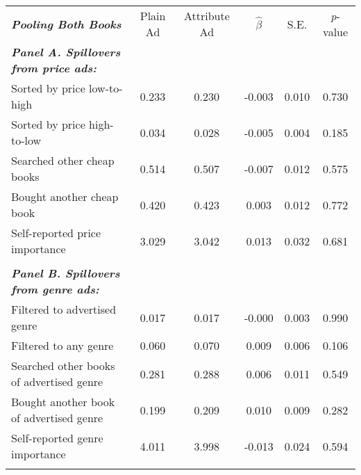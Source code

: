 \begin{center}
\begin{tabular}{lccccc}
\hline \noalign{\smallskip}\textbf{\emph{Pooling Both Books}} & Plain Ad & Attribute Ad & $\hat{\beta}$ & S.E. & \emph{p}-value\\
\noalign{\smallskip}\hline \noalign{\smallskip}\textbf{\emph{Panel A. Spillovers from price ads:}} &  &  &  &  & \\
\hspace{5pt} Sorted by price low-to-high & 0.233 & 0.230 & -0.003 & 0.010 & 0.730\\
\hspace{5pt} Sorted by price high-to-low & 0.034 & 0.028 & -0.005 & 0.004 & 0.185\\
\hspace{5pt} Searched other cheap books & 0.514 & 0.507 & -0.007 & 0.012 & 0.575\\
\hspace{5pt} Bought another cheap book & 0.420 & 0.423 & 0.003 & 0.012 & 0.772\\
\hspace{5pt} Self-reported price importance & 3.029 & 3.042 & 0.013 & 0.032 & 0.681\\
  &  &  &  &  & \\
\textbf{\emph{Panel B. Spillovers from genre ads:}} &  &  &  &  & \\
\hspace{5pt} Filtered to advertised genre & 0.017 & 0.017 & -0.000 & 0.003 & 0.990\\
\hspace{5pt} Filtered to any genre & 0.060 & 0.070 & 0.009 & 0.006 & 0.106\\
\hspace{5pt} Searched other books of advertised genre & 0.281 & 0.288 & 0.006 & 0.011 & 0.549\\
\hspace{5pt} Bought another book of advertised genre & 0.199 & 0.209 & 0.010 & 0.009 & 0.282\\
\hspace{5pt} Self-reported genre importance & 4.011 & 3.998 & -0.013 & 0.024 & 0.594\\
\noalign{\smallskip}\hline\end{tabular}\\
\end{center}
